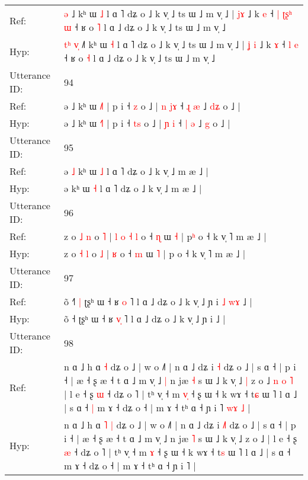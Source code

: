 \documentclass[10pt]{article}
\DeclareRobustCommand{\hl}[1]{{\textcolor{red}{#1}}}
\begin{document}
\begin{longtable}{ll}
Ref: & \hl{}\hl{}\hl{}\hl{}\hl{ə} ˩\hl{} kʰ ɯ \hl{˩} l ɑ ˥ dʑ o ˩ k v̩ ˩ ts ɯ ˩ m v̩ ˩ | \hl{}\hl{j}\hl{ɤ} ˩ k \hl{e} ˧\hl{ }\hl{|} \hl{ʈ}\hl{ʂ}\hl{ʰ} \hl{ɯ} ˧ ʁ o \hl{˥} l ɑ ˩ dʑ o ˩ k v̩ ˩ ts ɯ ˩ m v̩ ˩
 \\
Hyp: & \hl{t}\hl{ʰ}\hl{ }\hl{v}\hl{̩} ˩\hl{˥} kʰ ɯ \hl{˧} l ɑ ˥ dʑ o ˩ k v̩ ˩ ts ɯ ˩ m v̩ ˩ | \hl{ʝ}\hl{ }\hl{i} ˩ k \hl{ɤ} ˧\hl{}\hl{} \hl{}\hl{}\hl{l} \hl{e} ˧ ʁ o \hl{˧} l ɑ ˩ dʑ o ˩ k v̩ ˩ ts ɯ ˩ m v̩ ˩
 \\
\midrule
Utterance ID: & 94 \\
Ref: & ə ˩ kʰ ɯ \hl{˩}˥ | p i ˧ \hl{}\hl{z} o ˩ | \hl{n} \hl{j}\hl{ɤ} ˧ \hl{ɻ} \hl{æ} ˩ \hl{d}\hl{ʑ} o ˩ |
 \\
Hyp: & ə ˩ kʰ ɯ \hl{˧}˥ | p i ˧ \hl{t}\hl{s} o ˩ | \hl{ɲ} \hl{}\hl{i} ˧ \hl{|} \hl{ə} ˩ \hl{}\hl{g} o ˩ |
 \\
\midrule
Utterance ID: & 95 \\
Ref: & ə\hl{ }\hl{˩} kʰ ɯ \hl{˩} l ɑ ˥ dʑ o ˩ k v̩ ˩ m æ ˩ |
 \\
Hyp: & ə\hl{}\hl{} kʰ ɯ \hl{˧} l ɑ ˥ dʑ o ˩ k v̩ ˩ m æ ˩ |
 \\
\midrule
Utterance ID: & 96 \\
Ref: & z o \hl{˩} \hl{n} o \hl{˥} |\hl{ }\hl{l}\hl{ }\hl{o}\hl{ }\hl{˧} \hl{l} o ˧ \hl{ɳ} ɯ \hl{˧} | p\hl{ʰ} o ˧ k v̩ ˥ m æ ˩ |
 \\
Hyp: & z o \hl{˧} \hl{l} o \hl{˩} |\hl{}\hl{}\hl{}\hl{}\hl{}\hl{} \hl{ʁ} o ˧ \hl{m} ɯ \hl{˥} | p\hl{} o ˧ k v̩ ˥ m æ ˩ |
 \\
\midrule
Utterance ID: & 97 \\
Ref: & õ ˧\hl{˥}\hl{ }\hl{|} ʈʂʰ ɯ ˧ ʁ \hl{}\hl{o} ˥ l ɑ ˩ dʑ o ˩ k v̩ ˩ ɲ i\hl{ }\hl{˩}\hl{ }\hl{w}\hl{ɤ} ˩ |
 \\
Hyp: & õ ˧\hl{}\hl{}\hl{} ʈʂʰ ɯ ˧ ʁ \hl{v}\hl{̩} ˥ l ɑ ˩ dʑ o ˩ k v̩ ˩ ɲ i\hl{}\hl{}\hl{}\hl{}\hl{} ˩ |
 \\
\midrule
Utterance ID: & 98 \\
Ref: & n ɑ ˩ h ɑ\hl{}\hl{} \hl{˧} dʑ o ˩ | w o ˩˥ | n ɑ ˩ dʑ i \hl{}\hl{˧} dʑ o ˩ | s ɑ ˧ | p i ˧ | æ ˧ ʂ æ ˧ t ɑ ˩ m v̩ ˩\hl{ }\hl{|} n jæ \hl{˧} s ɯ ˩ k v̩ ˩\hl{ }\hl{|} z o ˩\hl{ }\hl{n}\hl{ }\hl{o}\hl{ }\hl{˥} | l e ˧ ʂ \hl{ɯ} ˧ dʑ o ˥ | tʰ v̩ ˧ m \hl{v}\hl{̩} ˧ ʂ ɯ ˧ k wɤ ˧ t\hl{ɕ} ɯ ˥ l ɑ ˩ | s ɑ ˧\hl{ }\hl{|} m ɤ ˧ dʑ o ˧ | m ɤ ˧ tʰ ɑ ˧ ɲ i ˥\hl{ }\hl{w}\hl{ɤ}\hl{ }\hl{˩} |
 \\
Hyp: & n ɑ ˩ h ɑ\hl{ }\hl{˥} \hl{|} dʑ o ˩ | w o ˩˥ | n ɑ ˩ dʑ i \hl{˩}\hl{˥} dʑ o ˩ | s ɑ ˧ | p i ˧ | æ ˧ ʂ æ ˧ t ɑ ˩ m v̩ ˩\hl{}\hl{} n jæ \hl{˥} s ɯ ˩ k v̩ ˩\hl{}\hl{} z o ˩\hl{}\hl{}\hl{}\hl{}\hl{}\hl{} | l e ˧ ʂ \hl{æ} ˧ dʑ o ˥ | tʰ v̩ ˧ m \hl{}\hl{ɤ} ˧ ʂ ɯ ˧ k wɤ ˧ t\hl{s} ɯ ˥ l ɑ ˩ | s ɑ ˧\hl{}\hl{} m ɤ ˧ dʑ o ˧ | m ɤ ˧ tʰ ɑ ˧ ɲ i ˥\hl{}\hl{}\hl{}\hl{}\hl{} |

\end{longtable}
\end{document}
